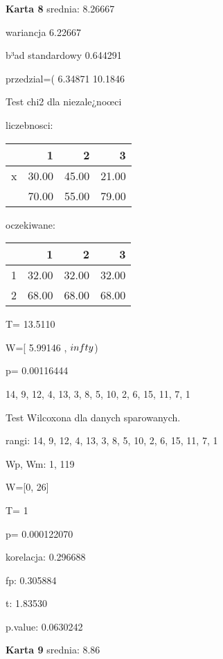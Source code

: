\documentclass[a4paper,12pt]{article}
\begin{document}
\begin{multicols}{3}
  \textbf{Karta  8 } 
 srednia: 8.26667 
     
     wariancja 6.22667  
     
     b³ad standardowy 0.644291 
     
     przedzial=( 6.34871 10.1846 \vspace{1cm} 

  Test chi2 dla niezale¿noœci 
   
   liczebnosci: %
\begin{tabular}{rrrr}
  \hline
 & 1 & 2 & 3 \\
  \hline
x & 30.00 & 45.00 & 21.00 \\
   & 70.00 & 55.00 & 79.00 \\
   \hline
\end{tabular}
 
   
   oczekiwane: %
\begin{tabular}{rrrr}
  \hline
 & 1 & 2 & 3 \\
  \hline
1 & 32.00 & 32.00 & 32.00 \\
  2 & 68.00 & 68.00 & 68.00 \\
   \hline
\end{tabular}
 
   
   T= 13.5110 
   
   W=[ 5.99146 , $\\infty$) 
   
   p= 0.00116444 \vspace{1cm} 

  14, 9, 12, 4, 13, 3, 8, 5, 10, 2, 6, 15, 11, 7, 1 

  Test Wilcoxona dla danych sparowanych. 
  
  rangi: 14, 9, 12, 4, 13, 3, 8, 5, 10, 2, 6, 15, 11, 7, 1 
  
  Wp, Wm:  1,  119 
  
  W=[0, 26]  
  
  T=  1 
  
  p= 0.000122070 \vspace{1cm} 

  korelacja: 0.296688
     
     fp: 0.305884
     
     t: 1.83530
     
     p.value: 0.0630242 \vspace{1cm} 

  \textbf{Karta  9 } 
 srednia: 8.86 
     

\end{multicols}
\end{document}
